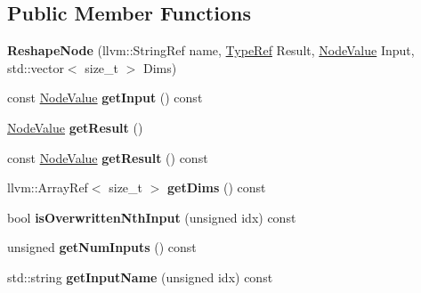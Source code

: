 \subsection*{Public Member Functions}
\begin{DoxyCompactItemize}
\item 
\mbox{\label{classglow_1_1_reshape_node_adf3226419a9311d99b6b319a6172d70f}} 
{\bfseries Reshape\+Node} (llvm\+::\+String\+Ref name, \hyperlink{structglow_1_1_type}{Type\+Ref} Result, \hyperlink{structglow_1_1_node_value}{Node\+Value} Input, std\+::vector$<$ size\+\_\+t $>$ Dims)
\item 
\mbox{\label{classglow_1_1_reshape_node_a503d10e335a024e81b47dfd3c3721a5f}} 
const \hyperlink{structglow_1_1_node_value}{Node\+Value} {\bfseries get\+Input} () const
\item 
\mbox{\label{classglow_1_1_reshape_node_ae6fcf0d3217a14235c11a0bcd558a573}} 
\hyperlink{structglow_1_1_node_value}{Node\+Value} {\bfseries get\+Result} ()
\item 
\mbox{\label{classglow_1_1_reshape_node_ae32c9cf08820198f3088592547e523a5}} 
const \hyperlink{structglow_1_1_node_value}{Node\+Value} {\bfseries get\+Result} () const
\item 
\mbox{\label{classglow_1_1_reshape_node_a6e77f479f6095a3483150c3e7091b75a}} 
llvm\+::\+Array\+Ref$<$ size\+\_\+t $>$ {\bfseries get\+Dims} () const
\item 
\mbox{\label{classglow_1_1_reshape_node_a0720f9e7c0df7e5c35796dbb5ca9e3d9}} 
bool {\bfseries is\+Overwritten\+Nth\+Input} (unsigned idx) const
\item 
\mbox{\label{classglow_1_1_reshape_node_aad7d589f5f894c382131e53d43a7981b}} 
unsigned {\bfseries get\+Num\+Inputs} () const
\item 
\mbox{\label{classglow_1_1_reshape_node_a7376dfd7b5047ae1948066c20d006f78}} 
std\+::string {\bfseries get\+Input\+Name} (unsigned idx) const
\item 

\end{DoxyCompactItemize}
